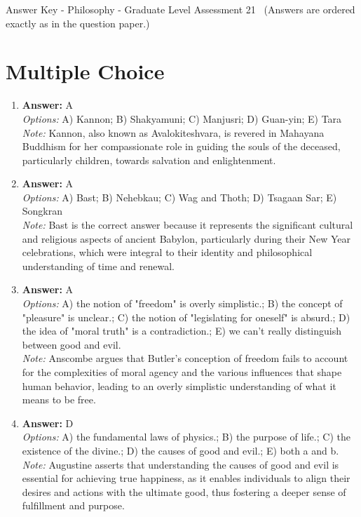 \documentclass[12pt]{article}
\begin{document}
\begin{center}
Answer Key - Philosophy - Graduate Level Assessment 21 \
\small (Answers are ordered exactly as in the question paper.)
\end{center}

\section*{Multiple Choice}
\begin{enumerate}[label=\arabic*.]
\item \textbf{Answer:} A
\\ \textit{Options:} A) Kannon; B) Shakyamuni; C) Manjusri; D) Guan-yin; E) Tara
\\ \textit{Note:} Kannon, also known as Avalokiteshvara, is revered in Mahayana Buddhism for her compassionate role in guiding the souls of the deceased, particularly children, towards salvation and enlightenment.
\item \textbf{Answer:} A
\\ \textit{Options:} A) Bast; B) Nehebkau; C) Wag and Thoth; D) Tsagaan Sar; E) Songkran
\\ \textit{Note:} Bast is the correct answer because it represents the significant cultural and religious aspects of ancient Babylon, particularly during their New Year celebrations, which were integral to their identity and philosophical understanding of time and renewal.
\item \textbf{Answer:} A
\\ \textit{Options:} A) the notion of "freedom" is overly simplistic.; B) the concept of "pleasure" is unclear.; C) the notion of "legislating for oneself" is absurd.; D) the idea of "moral truth" is a contradiction.; E) we can't really distinguish between good and evil.
\\ \textit{Note:} Anscombe argues that Butler's conception of freedom fails to account for the complexities of moral agency and the various influences that shape human behavior, leading to an overly simplistic understanding of what it means to be free.
\item \textbf{Answer:} D
\\ \textit{Options:} A) the fundamental laws of physics.; B) the purpose of life.; C) the existence of the divine.; D) the causes of good and evil.; E) both a and b.
\\ \textit{Note:} Augustine asserts that understanding the causes of good and evil is essential for achieving true happiness, as it enables individuals to align their desires and actions with the ultimate good, thus fostering a deeper sense of fulfillment and purpose.

\end{enumerate}
\end{document}
